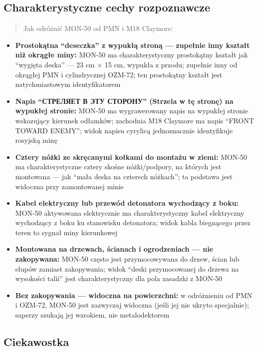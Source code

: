 \documentclass[12pt,oneside]{book}
\providecommand{\tightlist}{%
  \setlength{\itemsep}{0pt}\setlength{\parskip}{0pt}}
\begin{document}
\subsection{Charakterystyczne cechy
rozpoznawcze}\label{charakterystyczne-cechy-rozpoznawcze-127}

\begin{quote}
Jak odróżnić MON-50 od PMN i M18 Claymore:
\end{quote}

\begin{itemize}
\tightlist
\item
  \textbf{Prostokątna ``deseczka'' z wypukłą stroną --- zupełnie inny
  kształt niż okrągłe miny:} MON-50 ma charakterystyczny prostokątny
  kształt jak ``wygięta deska'' --- 23 cm × 15 cm, wypukła z przodu;
  zupełnie inny od okrągłej PMN i cylindrycznej OZM-72; ten prostokątny
  kształt jest natychmiastowym identyfikatorem
\item
  \textbf{Napis ``СТРЕЛЯЕТ В ЭТУ СТОРОНУ'' (Strzela w tę stronę) na
  wypukłej stronie:} MON-50 ma wygrawerowany napis na wypukłej stronie
  wskazujący kierunek odłamków; zachodnia M18 Claymore ma napis ``FRONT
  TOWARD ENEMY''; widok napisu cyrylicą jednoznacznie identyfikuje
  rosyjską minę
\item
  \textbf{Cztery nóżki ze skręcanymi kołkami do montażu w ziemi:} MON-50
  ma charakterystyczne cztery skośne nóżki/podpory, na których jest
  montowana --- jak ``mała deska na czterech nóżkach''; ta podstawa jest
  widoczna przy zamontowanej minie
\item
  \textbf{Kabel elektryczny lub przewód detonatora wychodzący z boku:}
  MON-50 aktywowana elektrycznie ma charakterystyczny kabel elektryczny
  wychodzący z boku ku stanowisku detonatora; widok kabla biegnącego
  przez teren to sygnał miny kierunkowej
\item
  \textbf{Montowana na drzewach, ścianach i ogrodzeniach --- nie
  zakopywana:} MON-50 często jest przymocowywana do drzew, ścian lub
  słupów zamiast zakopywania; widok ``deski przymocowanej do drzewa na
  wysokości talii'' jest charakterystyczny dla pola zasadzki z MON-50
\item
  \textbf{Bez zakopywania --- widoczna na powierzchni:} w odróżnieniu od
  PMN i OZM-72, MON-50 jest zazwyczaj widoczna (jeśli jej nie ukryto
  specjalnie); saperzy szukają jej wzrokiem, nie metalodektorem
\end{itemize}

\subsection{Ciekawostka}\label{ciekawostka-127}
\end{document}

